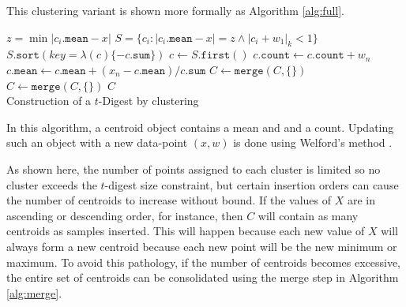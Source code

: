 \documentclass[11pt]{amsart}
\begin{document}
This clustering variant is shown more formally as Algorithm \ref{alg:full}.
 \begin{algorithm}[htb]
 \label{alg:full}
\SetNoFillComment
{}
 {
  $z = \min | c_i.\mathtt{mean} - x |$\;
  $S = \lbrace c_i  :  |c_i.\mathtt{mean} - x| = z \wedge |c_i+w_1|_k < 1 \rbrace $\;
   {
       $S.\mathtt{sort}( key=\lambda (c) \lbrace -c.\mathtt{sum} \rbrace)$\;
       $c \gets S.\mathtt{first()}$ \;
       $c.\mathtt{count} \gets c.\mathtt{count} + w_n$\;
       $c.\mathtt{mean} \gets c.\mathtt{mean} + (x_n- c.\mathtt{mean})/ c.\mathtt{sum}$\;
     } 
       {
         $C \gets \mathtt{merge}( C, \lbrace\rbrace ) $\;
       }
} 
$C \gets \mathtt{merge}( C, \lbrace\rbrace ) $\;
\Return $ C $\\
\caption{Construction of a $t$-Digest by clustering}
\end{algorithm}

In this algorithm, a centroid object contains a mean and and a count.  Updating such an object with a new data-point $(x,w)$ is done using Welford's method \cite{wiki:welford, knuth2welford, welford62}.

As shown here, the number of points assigned to each cluster is limited so no cluster exceeds the $t$-digest size constraint, but certain insertion orders can cause the number of centroids to increase without bound. If the values of $X$ are in ascending or descending order, for instance, then $C$ will contain as many centroids as samples inserted.  This will happen because each new value of $X$ will always form a new centroid because each new point will be the new minimum or maximum.  To avoid this pathology, if the number of centroids becomes excessive, the entire set of centroids can be consolidated using the merge step in Algorithm \ref{alg:merge}.  
\end{document}
